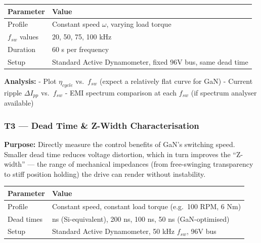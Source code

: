 \documentclass[
]{article}
\newcounter{none} %
\begin{document}
{\def\LTcaptype{none} %
\begin{longtable}[]{@{}ll@{}}
\toprule\noalign{}
Parameter & Value \\
\midrule\noalign{}
\endhead
\bottomrule\noalign{}
\endlastfoot
Profile & Constant speed \(\omega\), varying load torque \\
\(f_{sw}\) values & 20, 50, 75, 100 kHz \\
Duration & 60 s per frequency \\
Setup & Standard Active Dynamometer, fixed 96V bus, same dead time \\
\end{longtable}
}

\textbf{Analysis:} - Plot \(\eta_{cycle}\) vs.~\(f_{sw}\) (expect a
relatively flat curve for GaN) - Current ripple \(\Delta I_{pp}\)
vs.~\(f_{sw}\) - EMI spectrum comparison at each \(f_{sw}\) (if spectrum
analyser available)

\subsubsection{T3 --- Dead Time \& Z-Width
Characterisation}\label{t3-dead-time-z-width-characterisation}

\textbf{Purpose:} Directly measure the control benefits of GaN's
switching speed. Smaller dead time reduces voltage distortion, which in
turn improves the ``Z-width'' --- the range of mechanical impedances
(from free-swinging transparency to stiff position holding) the drive
can render without instability.

{\def\LTcaptype{none} %
\begin{longtable}[]{@{}
  >{\raggedright\arraybackslash}p{}
  >{\raggedright\arraybackslash}p{}@{}}
\toprule\noalign{}
\begin{minipage}[b]{\linewidth}\raggedright
Parameter
\end{minipage} & \begin{minipage}[b]{\linewidth}\raggedright
Value
\end{minipage} \\
\midrule\noalign{}
\endhead
\bottomrule\noalign{}
\endlastfoot
Profile & Constant speed, constant load torque (e.g.~100 RPM, 6 Nm) \\
Dead times & 500 ns (Si-equivalent), 200 ns, 100 ns, 50 ns
(GaN-optimised) \\
Setup & Standard Active Dynamometer, 50 kHz \(f_{sw}\), 96V bus \\
\end{longtable}
}
\end{document}
